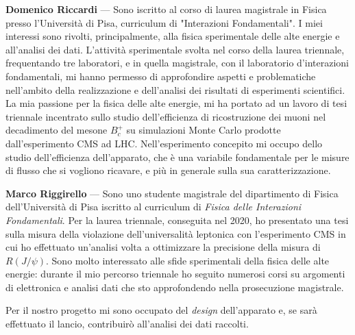 \documentclass[twocolumn, a4paper]{article}
\newenvironment{crewbio}[1]{\noindent\textbf{#1} ---}{\\}
\begin{document}
\begin{crewbio}{Domenico Riccardi}
Sono iscritto al corso di laurea magistrale in Fisica presso l'Università di Pisa, curriculum di "Interazioni Fondamentali". I miei interessi sono rivolti, principalmente, alla fisica sperimentale delle alte energie e all'analisi dei dati. L'attività sperimentale svolta nel corso della laurea triennale, frequentando tre laboratori, e in quella magistrale, con il laboratorio d'interazioni fondamentali, mi hanno permesso di approfondire aspetti e problematiche nell'ambito della realizzazione e dell'analisi dei risultati di esperimenti scientifici. La mia passione per la fisica delle alte energie, mi ha portato ad un lavoro di tesi triennale incentrato sullo studio dell'efficienza di ricostruzione dei muoni nel decadimento del mesone $B_c^+$ su simulazioni Monte Carlo prodotte dall'esperimento CMS ad LHC. Nell'esperimento concepito mi occupo dello studio dell'efficienza dell'apparato, che è una variabile fondamentale per le misure di flusso che si vogliono ricavare, e più in generale sulla sua caratterizzazione.
\end{crewbio}

\begin{crewbio}{Marco Riggirello}
Sono uno studente magistrale del dipartimento di Fisica dell'Università di Pisa iscritto al curriculum di \emph{Fisica delle Interazioni Fondamentali}. Per la laurea triennale, conseguita nel 2020, ho presentato una tesi sulla misura della violazione dell'universalità leptonica con l'esperimento CMS in cui ho effettuato un'analisi volta a ottimizzare la precisione della misura di $R(J/\psi)$. Sono molto interessato alle sfide sperimentali della fisica delle alte energie: durante il mio percorso triennale ho seguito numerosi corsi su argomenti di elettronica e analisi dati che sto approfondendo nella prosecuzione magistrale. 

Per il nostro progetto mi sono occupato del \emph{design} dell'apparato e, se sarà effettuato il lancio, contribuir\`o all'analisi dei dati raccolti.
\end{crewbio}
\end{document}
